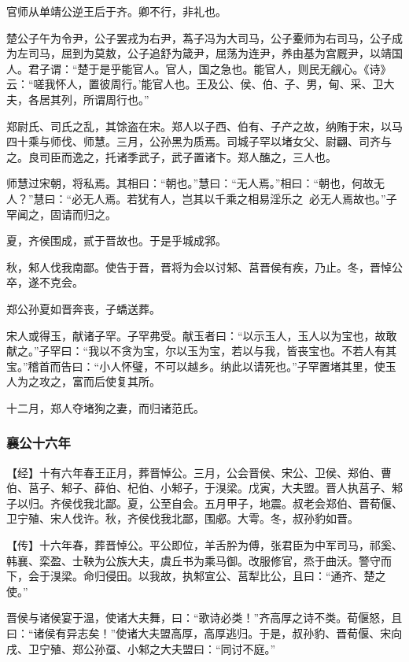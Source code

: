\documentclass[]{article}
\begin{document}
官师从单靖公逆王后于齐。卿不行，非礼也。

楚公子午为令尹，公子罢戎为右尹，蒍子冯为大司马，公子櫜师为右司马，公子成为左司马，屈到为莫敖，公子追舒为箴尹，屈荡为连尹，养由基为宫厩尹，以靖国人。君子谓：``楚于是乎能官人。官人，国之急也。能官人，则民无觎心。《诗》云：``嗟我怀人，置彼周行。'能官人也。王及公、侯、伯、子、男，甸、采、卫大夫，各居其列，所谓周行也。''

郑尉氏、司氏之乱，其馀盗在宋。郑人以子西、伯有、子产之故，纳贿于宋，以马四十乘与师伐、师慧。三月，公孙黑为质焉。司城子罕以堵女父、尉翩、司齐与之。良司臣而逸之，托诸季武子，武子置诸卞。郑人醢之，三人也。

师慧过宋朝，将私焉。其相曰：``朝也。''慧曰：``无人焉。''相曰：``朝也，何故无人？''慧曰：``必无人焉。若犹有人，岂其以千乘之相易淫乐之？必无人焉故也。''子罕闻之，固请而归之。

夏，齐侯围成，贰于晋故也。于是乎城成郛。

秋，邾人伐我南鄙。使告于晋，晋将为会以讨邾、莒晋侯有疾，乃止。冬，晋悼公卒，遂不克会。

郑公孙夏如晋奔丧，子蟜送葬。

宋人或得玉，献诸子罕。子罕弗受。献玉者曰：``以示玉人，玉人以为宝也，故敢献之。''子罕曰：``我以不贪为宝，尔以玉为宝，若以与我，皆丧宝也。不若人有其宝。''稽首而告曰：``小人怀璧，不可以越乡。纳此以请死也。''子罕置堵其里，使玉人为之攻之，富而后使复其所。

十二月，郑人夺堵狗之妻，而归诸范氏。

\hypertarget{header-n2029}{%
\subsubsection{襄公十六年}\label{header-n2029}}

【经】十有六年春王正月，葬晋悼公。三月，公会晋侯、宋公、卫侯、郑伯、曹伯、莒子、邾子、薛伯、杞伯、小邾子，于湨梁。戊寅，大夫盟。晋人执莒子、邾子以归。齐侯伐我北鄙。夏，公至自会。五月甲子，地震。叔老会郑伯、晋荀偃、卫宁殖、宋人伐许。秋，齐侯伐我北鄙，围郕。大雩。冬，叔孙豹如晋。

【传】十六年春，葬晋悼公。平公即位，羊舌肸为傅，张君臣为中军司马，祁奚、韩襄、栾盈、士鞅为公族大夫，虞丘书为乘马御。改服修官，烝于曲沃。警守而下，会于湨梁。命归侵田。以我故，执邾宣公、莒犁比公，且曰：``通齐、楚之使。''

晋侯与诸侯宴于温，使诸大夫舞，曰：``歌诗必类！''齐高厚之诗不类。荀偃怒，且曰：``诸侯有异志矣！''使诸大夫盟高厚，高厚逃归。于是，叔孙豹、晋荀偃、宋向戌、卫宁殖、郑公孙虿、小邾之大夫盟曰：``同讨不庭。''
\end{document}
